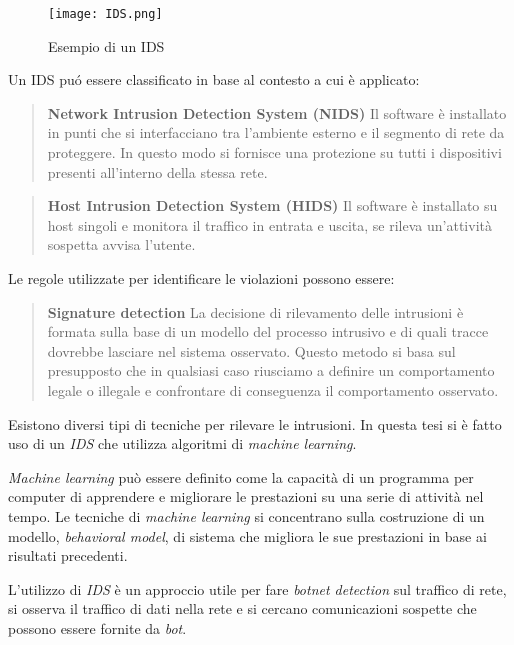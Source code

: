 \documentclass[../main.tex]{subfiles}
\begin{document}
\begin{figure}[H]
				\centering
				\texttt{[image: IDS.png]}
				\caption{Esempio di un IDS}
\end{figure}

Un IDS puó essere classificato in base al contesto a cui è applicato:

\begin{verse}
				\textbf{Network Intrusion Detection System (NIDS)} Il software è installato in punti che si interfacciano tra l'ambiente esterno e il segmento di rete da proteggere. In questo modo si fornisce una protezione su tutti i dispositivi presenti all'interno della stessa rete.
\end{verse}

\begin{verse}
				\textbf{Host Intrusion Detection System (HIDS)} Il software è installato su host singoli e monitora il traffico in entrata e uscita, se rileva un'attività sospetta avvisa l'utente.
\end{verse}

Le regole utilizzate per identificare le violazioni possono essere:

\begin{verse}
				\textbf{Signature detection} La decisione di rilevamento delle intrusioni è formata sulla base di un modello del processo intrusivo e di quali tracce dovrebbe lasciare nel sistema osservato. Questo metodo si basa sul presupposto che in qualsiasi caso riusciamo a definire un comportamento legale o illegale e confrontare di conseguenza il comportamento osservato.
\end{verse}





Esistono diversi tipi di tecniche per rilevare le intrusioni. In questa tesi si è fatto uso di un \textit{IDS} che utilizza algoritmi di \textit{machine learning}.

\textit{Machine learning} può essere definito come la capacità di un programma per computer di apprendere e migliorare le prestazioni su una serie di attività nel tempo. Le tecniche di \textit{machine learning} si concentrano sulla costruzione di un modello, \textit{behavioral model}, di sistema che migliora le sue prestazioni in base ai risultati precedenti. \newline


L'utilizzo di \textit{IDS} è un approccio utile per fare \textit{botnet detection} sul traffico di rete, si osserva il traffico di dati nella rete e si cercano comunicazioni sospette che possono essere fornite da \textit{bot}. \newline
\end{document}
